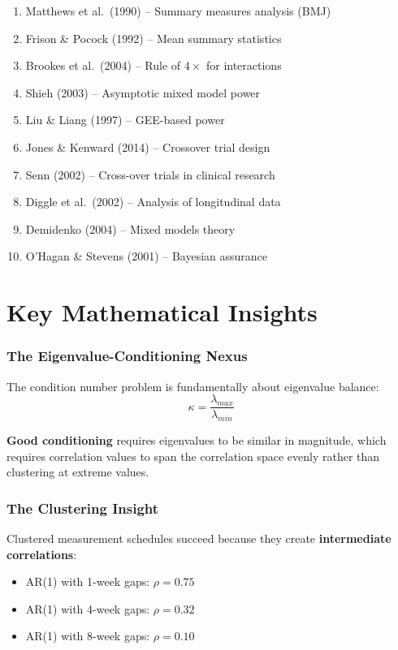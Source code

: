 \documentclass[11pt]{article}
\theoremstyle{definition}
\begin{document}
\begin{enumerate}
    \item Matthews et al.\ (1990) -- Summary measures analysis (BMJ)
    \item Frison \& Pocock (1992) -- Mean summary statistics
    \item Brookes et al.\ (2004) -- Rule of $4\times$ for interactions
    \item Shieh (2003) -- Asymptotic mixed model power
    \item Liu \& Liang (1997) -- GEE-based power
    \item Jones \& Kenward (2014) -- Crossover trial design
    \item Senn (2002) -- Cross-over trials in clinical research
    \item Diggle et al.\ (2002) -- Analysis of longitudinal data
    \item Demidenko (2004) -- Mixed models theory
    \item O'Hagan \& Stevens (2001) -- Bayesian assurance
\end{enumerate}

\part{Key Mathematical Insights}

\section{The Eigenvalue-Conditioning Nexus}

The condition number problem is fundamentally about eigenvalue balance:
\begin{equation}
\kappa = \frac{\lambda_{max}}{\lambda_{min}}
\end{equation}

\textbf{Good conditioning} requires eigenvalues to be similar in magnitude,
which requires correlation values to span the correlation space evenly rather
than clustering at extreme values.

\section{The Clustering Insight}

Clustered measurement schedules succeed because they create
\textbf{intermediate correlations}:
\begin{itemize}
    \item AR(1) with 1-week gaps: $\rho = 0.75$
    \item AR(1) with 4-week gaps: $\rho = 0.32$
    \item AR(1) with 8-week gaps: $\rho = 0.10$
\end{itemize}
\end{document}

